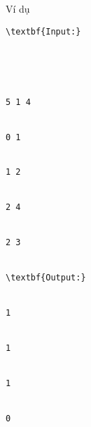 Ví dụ
\begin{verbatim}
\textbf{Input:}





5 1 4


0 1


1 2


2 4


2 3


\textbf{Output:}


1


1


1


0


\end{verbatim}